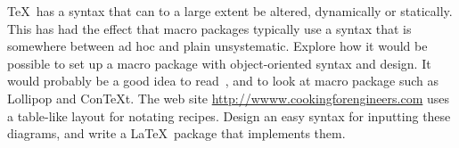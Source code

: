 \project \TeX\ has a syntax that can to a large extent be altered, 
dynamically or statically. This has had the effect that macro packages
typically use a syntax that is somewhere between ad hoc and plain
unsystematic. Explore how it would be possible to set up a macro
package with object-oriented syntax and design. It would probably be a
good idea to read~\cite{E3,E4,EL}, and to look at macro package such
as Lollipop and ConTeXt.
%
%
%
\project The web site \url{http://wwww.cookingforengineers.com} uses a
table-like layout for notating recipes. Design an easy syntax for
inputting these diagrams, and write a \LaTeX\ package that implements
them.
